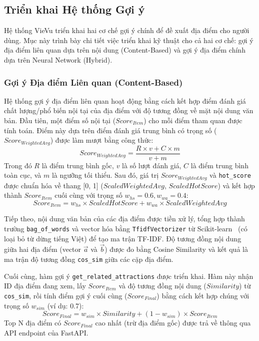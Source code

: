 \subsection{Triển khai Hệ thống Gợi ý}
\label{subsec:recsys_implementation_paragraph} %

Hệ thống VieVu triển khai hai cơ chế gợi ý chính để đề xuất địa điểm cho người dùng. Mục này trình bày chi tiết việc triển khai kỹ thuật cho cả hai cơ chế: gợi ý địa điểm liên quan dựa trên nội dung (Content-Based) và gợi ý địa điểm chính dựa trên Neural Network (Hybrid).

\subsubsection{Gợi ý Địa điểm Liên quan (Content-Based)}
\label{subsubsec:cb_recsys_impl_paragraph_final} %

Hệ thống gợi ý địa điểm liên quan hoạt động bằng cách kết hợp điểm đánh giá chất lượng/phổ biến nội tại của địa điểm với độ tương đồng về mặt nội dung văn bản. Đầu tiên, một điểm số nội tại ($Score_{Item}$) cho mỗi điểm tham quan được tính toán. Điểm này dựa trên điểm đánh giá trung bình có trọng số ($Score_{WeightedAvg}$) được làm mượt bằng công thức:
$$Score_{WeightedAvg} = \frac{R \times v + C \times m}{v + m}$$
Trong đó $R$ là điểm trung bình gốc, $v$ là số lượt đánh giá, $C$ là điểm trung bình toàn cục, và $m$ là ngưỡng tối thiểu. Sau đó, giá trị $Score_{WeightedAvg}$ và \texttt{hot\_score} được chuẩn hóa về thang [0, 1] ($ScaledWeightedAvg$, $ScaledHotScore$) và kết hợp thành $Score_{Item}$ cuối cùng với trọng số $w_{hs}=0.6, w_{wa}=0.4$:
$$Score_{Item} = w_{hs} \times ScaledHotScore + w_{wa} \times ScaledWeightedAvg$$

Tiếp theo, nội dung văn bản của các địa điểm được tiền xử lý, tổng hợp thành trường \texttt{bag\_of\_words} và vector hóa bằng \texttt{TfidfVectorizer} từ Scikit-learn~\cite{sklearn_lib} (có loại bỏ từ dừng tiếng Việt) để tạo ma trận TF-IDF. Độ tương đồng nội dung giữa hai địa điểm (vector $\vec{a}$ và $\vec{b}$) được đo bằng Cosine Similarity và kết quả là ma trận độ tương đồng \texttt{cos\_sim} giữa các cặp địa điểm. %

Cuối cùng, hàm gợi ý \texttt{get\_related\_attractions} được triển khai. Hàm này nhận ID địa điểm đang xem, lấy $Score_{Item}$ và độ tương đồng nội dung ($Similarity$) từ \texttt{cos\_sim}, rồi tính điểm gợi ý cuối cùng ($Score_{Final}$) bằng cách kết hợp chúng với trọng số $w_{sim}$ (ví dụ: 0.7):
$$Score_{Final} = w_{sim} \times Similarity + (1 - w_{sim}) \times Score_{Item}$$
Top N địa điểm có $Score_{Final}$ cao nhất (trừ địa điểm gốc) được trả về thông qua API endpoint của FastAPI. %


